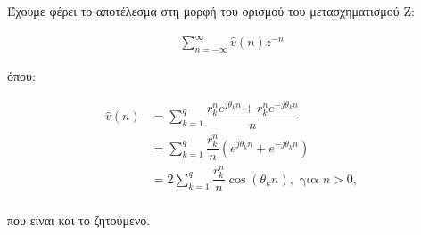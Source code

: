 \documentclass[12pt,a4paper]{article}
\begin{document}
		Έχουμε φέρει το αποτέλεσμα στη μορφή του ορισμού του μετασχηματισμού Z:
		
		\begin{align*}
			\sum_{n=-\infty}^{\infty} \hat v(n) z^{-n}
		\end{align*}
		
		όπου:
		
		\begin{align*}
			\hat v(n) &= \sum_{k=1}^{q} \dfrac{r_k^ne^{j\theta_kn}+r_k^ne^{-j\theta_kn}}{n} \\
			&= \sum_{k=1}^{q} \dfrac{r_k^n}{n}\left(e^{j\theta_kn}+e^{-j\theta_kn}\right) \\
			&= 2 \sum_{k=1}^{q} \dfrac{r_k^n}{n} \cos(\theta_k n), \text{ για } n > 0, \\
		\end{align*}
		
		που είναι και το ζητούμενο.
\end{document}
